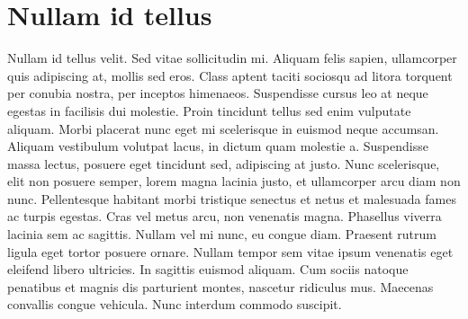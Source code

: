 \section{Nullam id tellus}
\label{sec:lateracao}
 
Nullam id tellus velit. Sed vitae sollicitudin mi. Aliquam felis sapien, ullamcorper quis adipiscing at, mollis sed eros. Class aptent taciti sociosqu ad litora torquent per conubia nostra, per inceptos himenaeos. Suspendisse cursus leo at neque egestas in facilisis dui molestie. Proin tincidunt tellus sed enim vulputate aliquam. Morbi placerat nunc eget mi scelerisque in euismod neque accumsan. Aliquam vestibulum volutpat lacus, in dictum quam molestie a. Suspendisse massa lectus, posuere eget tincidunt sed, adipiscing at justo. Nunc scelerisque, elit non posuere semper, lorem magna lacinia justo, et ullamcorper arcu diam non nunc. Pellentesque habitant morbi tristique senectus et netus et malesuada fames ac turpis egestas. Cras vel metus arcu, non venenatis magna. Phasellus viverra lacinia sem ac sagittis. Nullam vel mi nunc, eu congue diam. Praesent rutrum ligula eget tortor posuere ornare. Nullam tempor sem vitae ipsum venenatis eget eleifend libero ultricies. In sagittis euismod aliquam. Cum sociis natoque penatibus et magnis dis parturient montes, nascetur ridiculus mus. Maecenas convallis congue vehicula. Nunc interdum commodo suscipit.

